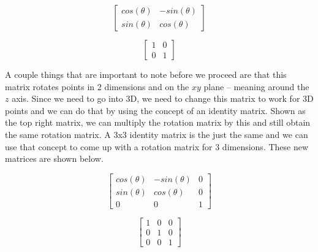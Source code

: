 \documentclass[14pt]{article}
\begin{document}
\begin{figure}[h]
	\begin{center}
		\begin{minipage}[b]{0.45\textwidth}
			\centering
			
			$$
			\begin{bmatrix}
			cos(\theta) & -sin(\theta) \\
			sin(\theta) & cos(\theta)
			\end{bmatrix}
			$$
		\end{minipage}
		\hfill
		\begin{minipage}[b]{0.45\textwidth}
			\centering
			$$
			\begin{bmatrix}
			1 & 0 \\
			0 & 1
			\end{bmatrix}			
			$$
		\end{minipage}
	\end{center}
\end{figure}

A couple things that are important to note before we proceed are that this matrix rotates points in 2 dimensions and on the $xy$ plane -- meaning around the $z$ axis. Since we need to go into 3D, we need to change this matrix to work for 3D points and we can do that by using the concept of an identity matrix. Shown as the top right matrix, we can multiply the rotation matrix by this and still obtain the same rotation matrix. A 3x3 identity matrix is the just the same and we can use that concept to come up with a rotation matrix for 3 dimensions. These new matrices are shown below.

\begin{figure}[H]
	\vspace*{1em}
	\begin{center}
		\begin{minipage}[b]{0.45\textwidth}
			\centering
			
			$$
			\begin{bmatrix}
			cos(\theta) & -sin(\theta) & 0 \\
			sin(\theta) & cos(\theta) & 0 \\ 
			0 & 0 & 1
			\end{bmatrix}
			$$
		\end{minipage}
		\hfill
		\begin{minipage}[b]{0.45\textwidth}
			\centering
			$$
			\begin{bmatrix}
			1 & 0 & 0 \\
			0 & 1 & 0 \\
			0 & 0 & 1
			\end{bmatrix}			
			$$
		\end{minipage}
	\end{center}
\end{figure}
\end{document}
